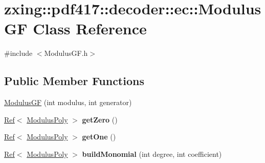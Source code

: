 \hypertarget{classzxing_1_1pdf417_1_1decoder_1_1ec_1_1_modulus_g_f}{}\section{zxing\+:\+:pdf417\+:\+:decoder\+:\+:ec\+:\+:Modulus\+GF Class Reference}
\label{classzxing_1_1pdf417_1_1decoder_1_1ec_1_1_modulus_g_f}


{\ttfamily \#include $<$Modulus\+G\+F.\+h$>$}

\subsection*{Public Member Functions}
\begin{DoxyCompactItemize}
\item 
\mbox{\hyperlink{classzxing_1_1pdf417_1_1decoder_1_1ec_1_1_modulus_g_f_ac84c5c931195a31959169e0a1c20b564}{Modulus\+GF}} (int modulus, int generator)
\item 
\mbox{\label{classzxing_1_1pdf417_1_1decoder_1_1ec_1_1_modulus_g_f_a207d3730315f2a8e7fd7c5c71ee8ed3d}} 
\mbox{\hyperlink{classzxing_1_1_ref}{Ref}}$<$ \mbox{\hyperlink{classzxing_1_1pdf417_1_1decoder_1_1ec_1_1_modulus_poly}{Modulus\+Poly}} $>$ {\bfseries get\+Zero} ()
\item 
\mbox{\label{classzxing_1_1pdf417_1_1decoder_1_1ec_1_1_modulus_g_f_a66bf0d9d8e5b6b7d0024700b62c4bc04}} 
\mbox{\hyperlink{classzxing_1_1_ref}{Ref}}$<$ \mbox{\hyperlink{classzxing_1_1pdf417_1_1decoder_1_1ec_1_1_modulus_poly}{Modulus\+Poly}} $>$ {\bfseries get\+One} ()
\item 
\mbox{\label{classzxing_1_1pdf417_1_1decoder_1_1ec_1_1_modulus_g_f_a5d34ed1cbf933c24a8906db47737a8a3}} 
\mbox{\hyperlink{classzxing_1_1_ref}{Ref}}$<$ \mbox{\hyperlink{classzxing_1_1pdf417_1_1decoder_1_1ec_1_1_modulus_poly}{Modulus\+Poly}} $>$ {\bfseries build\+Monomial} (int degree, int coefficient)
\item 
\mbox{\label{classzxing_1_1pdf417_1_1decoder_1_1ec_1_1_modulus_g_f_a9e31feab4de49c96e3263dad123a53c4}} 

\end{DoxyCompactItemize}
